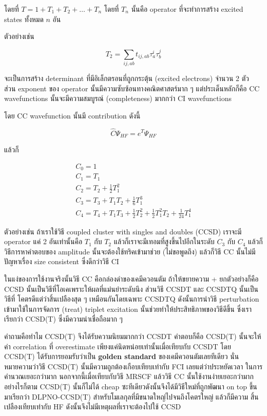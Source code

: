 \noindent โดยที่ $T = 1 + T_{1} + T_{2} + \dots + T_{n}$ โดยที่ $T_{n}$ นั้นคือ
operator ที่จะทำการสร้าง excited states ทั้งหมด $n$ อัน

ตัวอย่างเช่น

\begin{equation}
    T_{2} = \sum_{ij,ab} t_{ij,ab} \tau^{i}_{a} \tau^{j}_{b}
\end{equation}

จะเป็นการสร้าง determinant ที่มีอิเล็กตรอนที่ถูกกระตุ้น (excited electrons) จำนวน 2 ตัว
ส่วน exponent ของ operator นั้นมีความซับซ้อนทางคณิตศาสตร์มาก ๆ แต่ประเด็นหลักก็คือ
CC wavefunctions นั้นจะมีความสมบูรณ์ (completeness) มากกว่า CI wavefunctions

โดย CC wavefunction นั้นมี contribution ดังนี้

\begin{equation}
    \hat{C} \Psi_{HF} = e^{T} \Psi_{HF}
\end{equation}

แล้วก็

\begin{gather}
    C_{0} = 1 \\
    C_{1} = T_{1} \\
    C_{2} = T_{2} + \frac{1}{2}T^{2}_{1} \\
    C_{3} = T_{3} + T_{1}T_{2} + \frac{1}{6}T^{3}_{1} \\
    C_{4} = T_{4} + T_{1}T_{3} + \frac{1}{2}T^{2}_{2}
    + \frac{1}{2}T^{2}_{1} T_{2} + \frac{1}{24}T^{4}_{1}
\end{gather}

ตัวอย่างเช่น ถ้าเราใช้วิธี coupled cluster with singles and doubles (CCSD) เราจะมี
operator แค่ 2 อันเท่านั้นคือ $T_{1}$ กับ $T_{2}$ แล้วก็เราจะมีเทอมที่สูงขึ้นไปอีกในระดับ
$C_{3}$ กับ $C_{4}$ แล้วก็วิธีการหาคำตอบของ amplitude นั้นจะต้องใช้ทริคเข้ามาช่วย
(ไม่ขอพูดถึง) แล้วก็วิธี CC นั้นไม่มีปัญหาเรื่อง size consistent ซึ่งดีกว่าวิธี CI

ในแง่ของการใช้งานจริงนั้นวิธี CC คือกล่องดำของเคมีควอนตัม ถ้าให้ขยายความ + ยกตัวอย่างก็คือ
CCSD นั้นเป็นวิธีที่โอเคเพราะให้ผลที่แม่นยำระดับนึง ส่วนวิธี CCSDT และ CCSDTQ นั้นเป็นวิธีที่%
โคตรดีแต่ว่าสิ้นเปลืองสุด ๆ เหมือนกันโดยเฉพาะ CCSDTQ ดังนั้นการนำวิธี perturbation
เข้ามาใช้ในการจัดการ (treat) triplet excitation นั้นช่วยทำให้ประสิทธิภาพของวิธีดีขึ้น
ซึ่งเราเรียกว่า CCSD(T) ซึ่งมีความน่าเชื่อถือมาก ๆ

คำถามคือทำไม CCSD(T) จึงได้รับความนิยมมากกว่า CCSDT คำตอบก็คือ CCSD(T) นั้นจะให้ค่า
correlation ที่ overestimate เพียงแค่นิดหน่อยเท่านั้นเมื่อเทียบกับ CCSDT โดย CCSD(T)
ได้รับการยอมรับว่าเป็น \textbf{golden standard} ของเคมีควอนตัมเลยทีเดียว
นั่นหมายความว่าวิธี CCSD(T) นั้นมีความถูกต้องเกือบเทียบเท่ากับ FCI เลยแต่ว่าประหยัดเวลา%
ในการคำนวณเยอะกว่ามาก นอกจากนี้เมื่อเทียบกับวิธี MRSCF แล้ววิธี CC นั้นใช้งานง่ายเยอะกว่ามาก
อย่างไรก็ตาม CCSD(T) นั้นก็ไม่ได้ cheap ซะทีเดียวดังนั้นจึงได้มีวิธีใหม่ที่ถูกพัฒนา on top
ขึ้นมาเรียกว่า DLPNO-CCSD(T) สำหรับโมเลกุลที่มีขนาดใหญ่ไปจนถึงโคตรใหญ่ แล้วก็มีความ%
สิ้นเปลืองเทียบเท่ากับ HF ดังนั้นจึงไม่มีเหตุผลที่เราจะต้องไปใช้ CCSD

